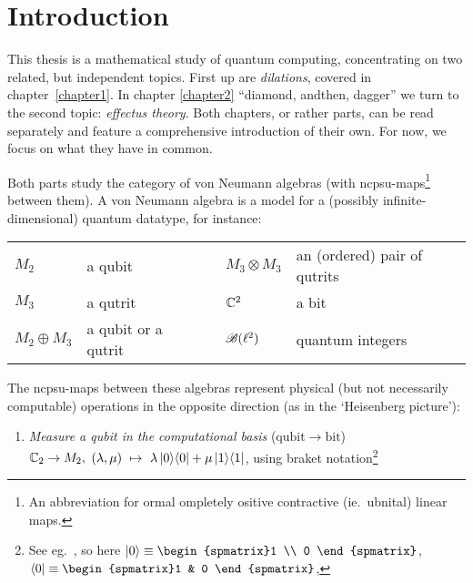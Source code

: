 
\chapter{Introduction}
\begin{parsec}%
\begin{point}%
This thesis is a mathematical study of quantum computing, concentrating
    on two related, but independent topics.
First up are \emph{dilations}, covered in chapter~\ref{chapter1}.
    In chapter \ref{chapter2}
    ``diamond, andthen, dagger''
    we turn to the second topic: \emph{effectus theory}.
Both chapters, or rather parts, can be read separately
    and feature a comprehensive introduction of their own.
For now, we focus on what they have in common.
\begin{point}%
Both parts study the category of von Neumann algebras
    (with ncpsu-maps\footnote{%
        An abbreviation for ormal ompletely ositive contractive (ie.~ubnital) linear maps.} between them).
A von Neumann algebra is a model for a (possibly infinite-dimensional)
    quantum datatype, for instance:
\begin{center}
    \begin{tabular}{lllll}
        $M_2$ & a qubit &\quad\qquad& $M_3 \otimes M_3$ & an (ordered) pair of qutrits \\
        $M_3$ & a qutrit && $\mathbb{C}^2$ & a bit \\
        $M_2 \oplus M_3$ & a qubit or a qutrit &
        & $\mathscr{B}(\ell^2)$ & quantum integers
\end{tabular}
\end{center}
The ncpsu-maps between these algebras represent physical
    (but not necessarily computable) operations
        in the opposite direction
        (as in the `Heisenberg picture'):
\begin{enumerate}
\item
    \emph{Measure a qubit in the computational basis} \quad
            ($\mathrm{qubit} \to \mathrm{bit}$)\\
        $\mathbb{C}_2 \rightarrow M_2,$ \quad 
        $(\lambda,\mu) \ \mapsto\ \lambda \left|0\right>\!\left<0\right| + \mu \left|1\right>\!\left<1\right|$,
        \quad using braket notation\footnote{%
            See eg.~\cite[fig.~2.1]{nielsen2002quantum},
            so here
            $\ket{0}\equiv\begin{spmatrix}1 \\ 0 \end{spmatrix}$,
            $\bra{0}\equiv\begin{spmatrix}1 & 0 \end{spmatrix}$,
}
\end{enumerate}
\end{point}
\end{point}
\end{parsec}
